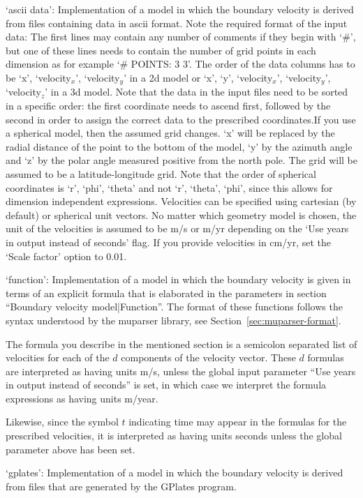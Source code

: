 \begin{itemize}
`ascii data': Implementation of a model in which the boundary velocity is derived from files containing data in ascii format. Note the required format of the input data: The first lines may contain any number of comments if they begin with `#', but one of these lines needs to contain the number of grid points in each dimension as for example `# POINTS: 3 3'. The order of the data columns has to be `x', `velocity${}_x$', `velocity${}_y$' in a 2d model or `x', `y', `velocity${}_x$', `velocity${}_y$', `velocity${}_z$' in a 3d model. Note that the data in the input files need to be sorted in a specific order: the first coordinate needs to ascend first, followed by the second in order to assign the correct data to the prescribed coordinates.If you use a spherical model, then the assumed grid changes. `x' will be replaced by the radial distance of the point to the bottom of the model, `y' by the azimuth angle and `z' by the polar angle measured positive from the north pole. The grid will be assumed to be a latitude-longitude grid. Note that the order of spherical coordinates is `r', `phi', `theta' and not `r', `theta', `phi', since this allows for dimension independent expressions. Velocities can be specified using cartesian (by default) or spherical unit vectors. No matter which geometry model is chosen, the unit of the velocities is assumed to be m/s or m/yr depending on the `Use years in output instead of seconds' flag. If you provide velocities in cm/yr, set the `Scale factor' option to 0.01.

`function': Implementation of a model in which the boundary velocity is given in terms of an explicit formula that is elaborated in the parameters in section ``Boundary velocity model|Function''. The format of these functions follows the syntax understood by the muparser library, see Section~\ref{sec:muparser-format}.

The formula you describe in the mentioned section is a semicolon separated list of velocities for each of the $d$ components of the velocity vector. These $d$ formulas are interpreted as having units m/s, unless the global input parameter ``Use years in output instead of seconds'' is set, in which case we interpret the formula expressions as having units m/year.

Likewise, since the symbol $t$ indicating time may appear in the formulas for the prescribed velocities, it is interpreted as having units seconds unless the global parameter above has been set.

`gplates': Implementation of a model in which the boundary velocity is derived from files that are generated by the GPlates program.


\end{itemize}
